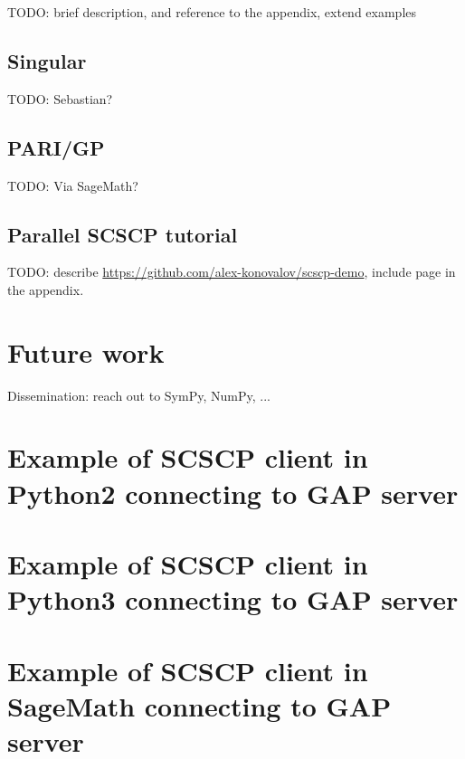 \documentclass{deliverablereport}
\begin{document}
TODO: brief description, and reference to the appendix, extend examples


\subsection{Singular}

TODO: Sebastian?


\subsection{PARI/GP}

TODO: Via SageMath?


\subsection{Parallel SCSCP tutorial}

TODO: describe \url{https://github.com/alex-konovalov/scscp-demo},
include page in the appendix.

\section{Future work}

Dissemination: reach out to SymPy, NumPy, ...


\printbibliography

\appendix
\section{Example of SCSCP client in Python2 connecting to GAP server}

\section{Example of SCSCP client in Python3 connecting to GAP server}

\section{Example of SCSCP client in SageMath connecting to GAP server}

%
%
\end{document}
